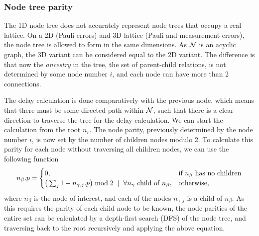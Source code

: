 \subsubsection{Node tree parity}

The 1D node tree does not accurately represent node trees that occupy a real lattice. On a 2D (Pauli errors) and 3D lattice (Pauli and measurement errors), the node tree is allowed to form in the same dimensions. As $\mathcal{N}$ is an acyclic graph, the 3D variant can be considered equal to the 2D variant. The difference is that now the \emph{ancestry} in the tree, the set of parent-child relations, is not determined by some node number $i$, and each node can have more than 2 connections.

The delay calculation is done comparatively with the previous node, which means that there must be some directed path within $\mathcal{N}$, such that there is a clear direction to traverse the tree for the delay calculation. We can start the calculation from the root $n_r$. The node parity, previously determined by the node number $i$, is now set by the number of children nodes modulo 2. To calculate this parity for each node without traversing all children nodes, we can use the following function
\begin{equation}\label{eq:nodeparitypart}
  n_\beta.p =
  \begin{cases}
    0, & \mbox{if $n_\beta$ has no children}  \\
    \big( \sum_{j} 1-n_{\gamma,j}.p \big ) \bmod 2 \hspace{.2cm} | \hspace{.2cm} \forall n_\gamma \mbox{ child of } n_\beta, & \mbox{otherwise},
  \end{cases}
\end{equation}
where $n_\beta$ is the node of interest, and each of the nodes $n_{\gamma,j}$ is a child of $n_\beta$. As this requires the parity of each child node to be known, the node parities of the entire set can be calculated by a depth-first search (DFS) of the node tree, and traversing back to the root recursively and applying the above equation.

